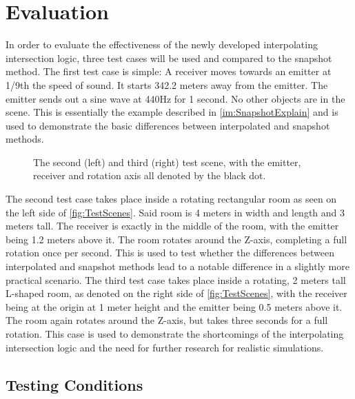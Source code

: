 \chapter{Evaluation}\label{ch:Evaluation}

In order to evaluate the effectiveness of the newly developed interpolating intersection logic,
three test cases will be used and compared to the snapshot method.
\newline
The first test case is simple: A receiver moves towards an emitter at 1/9th the speed of sound.
It starts 342.2 meters away from the emitter.
The emitter sends out a sine wave at 440Hz for 1 second.
No other objects are in the scene.
\newline
This is essentially the example described in \ref{im:SnapshotExplain}
and is used to demonstrate the basic differences between interpolated and snapshot methods.
\newline
\begin{figure}[t!]
    
    \caption[The second and third test scene]{The second (left) and third (right) test scene, with the emitter, receiver and rotation axis all denoted by the black dot.}\label{fig:TestScenes}
\end{figure}
The second test case takes place inside a rotating rectangular room as seen on the left side of \autoref{fig:TestScenes}.
Said room is 4 meters in width and length and 3 meters tall.
The receiver is exactly in the middle of the room,
with the emitter being 1.2 meters above it.
The room rotates around the Z-axis, completing a full rotation once per second.
\newline
This is used to test whether the differences between interpolated and snapshot methods
lead to a notable difference in a slightly more practical scenario.
\newline
The third test case takes place inside a rotating, 2 meters tall L-shaped room,
as denoted on the right side of \autoref{fig:TestScenes},
with the receiver being at the origin at 1 meter height and the emitter being 0.5 meters above it.
The room again rotates around the Z-axis, but takes three seconds for a full rotation.
\newline
This case is used to demonstrate the shortcomings of the interpolating intersection logic
and the need for further research for realistic simulations.

\section{Testing Conditions}

